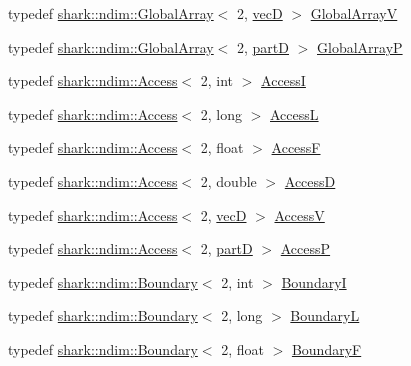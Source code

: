 \begin{DoxyCompactItemize}
\item 
typedef \hyperlink{classshark_1_1ndim_1_1_global_array}{shark\+::ndim\+::\+Global\+Array}$<$ 2, \hyperlink{namespaceshark_1_1types2d_a738ed8ca791a1fce6898c99ca68afc45}{vecD} $>$ \hyperlink{namespaceshark_1_1types2d_ae6263819e3d2ff5edf4c2c7621416a18}{Global\+ArrayV}
\item 
typedef \hyperlink{classshark_1_1ndim_1_1_global_array}{shark\+::ndim\+::\+Global\+Array}$<$ 2, \hyperlink{namespaceshark_1_1types2d_a87ef5d69759f5e1abf90fa90d89ff15c}{partD} $>$ \hyperlink{namespaceshark_1_1types2d_a513d51b67cefb022178c1c1fd9a018ad}{Global\+ArrayP}
\item 
typedef \hyperlink{classshark_1_1ndim_1_1_access}{shark\+::ndim\+::\+Access}$<$ 2, int $>$ \hyperlink{namespaceshark_1_1types2d_ab507e903a99e375ac01fed59caa31c59}{AccessI}
\item 
typedef \hyperlink{classshark_1_1ndim_1_1_access}{shark\+::ndim\+::\+Access}$<$ 2, long $>$ \hyperlink{namespaceshark_1_1types2d_a95d0053232dee1b2413e9de79f157a32}{AccessL}
\item 
typedef \hyperlink{classshark_1_1ndim_1_1_access}{shark\+::ndim\+::\+Access}$<$ 2, float $>$ \hyperlink{namespaceshark_1_1types2d_a6fb40d33e103ffc80e690a4113ead47e}{AccessF}
\item 
typedef \hyperlink{classshark_1_1ndim_1_1_access}{shark\+::ndim\+::\+Access}$<$ 2, double $>$ \hyperlink{namespaceshark_1_1types2d_a2033830d411d0561a2a0b401fe02c742}{AccessD}
\item 
typedef \hyperlink{classshark_1_1ndim_1_1_access}{shark\+::ndim\+::\+Access}$<$ 2, \hyperlink{namespaceshark_1_1types2d_a738ed8ca791a1fce6898c99ca68afc45}{vecD} $>$ \hyperlink{namespaceshark_1_1types2d_a4bf6da157911632c8f9e21dadaae4c15}{AccessV}
\item 
typedef \hyperlink{classshark_1_1ndim_1_1_access}{shark\+::ndim\+::\+Access}$<$ 2, \hyperlink{namespaceshark_1_1types2d_a87ef5d69759f5e1abf90fa90d89ff15c}{partD} $>$ \hyperlink{namespaceshark_1_1types2d_a73db0c29a8a46ed6b1778768179d89c8}{AccessP}
\item 
typedef \hyperlink{classshark_1_1ndim_1_1_boundary}{shark\+::ndim\+::\+Boundary}$<$ 2, int $>$ \hyperlink{namespaceshark_1_1types2d_af9530bdbc6f563435c3b32a3e38f38dd}{BoundaryI}
\item 
typedef \hyperlink{classshark_1_1ndim_1_1_boundary}{shark\+::ndim\+::\+Boundary}$<$ 2, long $>$ \hyperlink{namespaceshark_1_1types2d_acd96cb94805f075974d2530ce0553668}{BoundaryL}
\item 
typedef \hyperlink{classshark_1_1ndim_1_1_boundary}{shark\+::ndim\+::\+Boundary}$<$ 2, float $>$ \hyperlink{namespaceshark_1_1types2d_a25b77980ffbf351c7a2aed02cbce2b28}{BoundaryF}

\end{DoxyCompactItemize}
